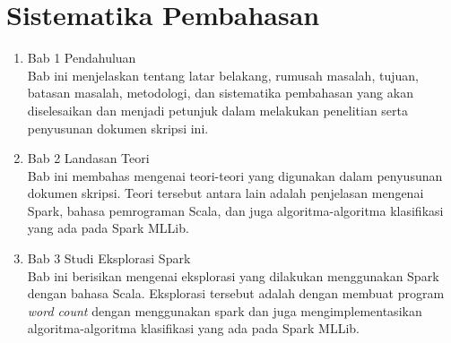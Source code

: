 \section{Sistematika Pembahasan}
\label{sec:sispem}
\begin{enumerate}
\item Bab 1 Pendahuluan\\
Bab ini menjelaskan tentang latar belakang, rumusah masalah, tujuan, batasan masalah, metodologi, dan sistematika pembahasan yang akan diselesaikan dan menjadi petunjuk dalam melakukan penelitian serta penyusunan dokumen skripsi ini.
\item Bab 2 Landasan Teori\\
Bab ini membahas mengenai teori-teori yang digunakan dalam penyusunan dokumen skripsi. Teori tersebut antara lain adalah penjelasan mengenai Spark, bahasa pemrograman Scala, dan juga algoritma-algoritma klasifikasi yang ada pada Spark MLLib.
\item Bab 3 Studi Eksplorasi Spark\\
Bab ini berisikan mengenai eksplorasi yang dilakukan menggunakan Spark dengan bahasa Scala. Eksplorasi tersebut adalah dengan membuat program \textit{word count} dengan menggunakan spark dan juga mengimplementasikan algoritma-algoritma klasifikasi yang ada pada Spark MLLib.
\end{enumerate}